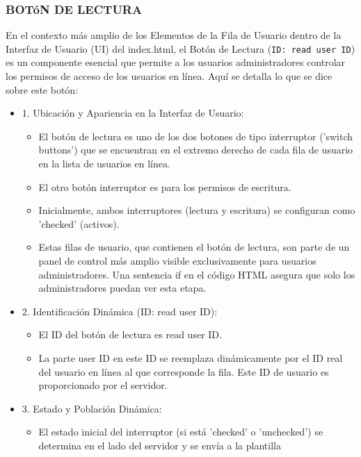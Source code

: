 \documentclass{report}
\begin{document}
\subsubsection{BOTóN DE LECTURA}
En el contexto más amplio de los Elementos de la Fila de Usuario dentro de la Interfaz de Usuario (UI) del index.html, el Botón de 
Lectura (\verb|ID: read user ID|) es un componente esencial que permite a los usuarios administradores controlar los permisos de acceso de 
los usuarios en línea.
Aquí se detalla lo que se dice sobre este botón:
\begin{itemize}
    \item 1. Ubicación y Apariencia en la Interfaz de Usuario:
        \begin{itemize}
            \item El botón de lectura es uno de los dos botones de tipo interruptor ('switch buttons') que se encuentran en el extremo 
            derecho de cada fila de usuario en la lista de usuarios en línea.
            \item El otro botón interruptor es para los permisos de escritura.
            \item Inicialmente, ambos interruptores (lectura y escritura) se configuran como 'checked' (activos).
            \item Estas filas de usuario, que contienen el botón de lectura, son parte de un panel de control más amplio visible exclusivamente 
            para usuarios administradores. Una sentencia if en el código HTML asegura que solo los administradores puedan ver esta etapa.        
        \end{itemize}
    \item 2. Identificación Dinámica (ID: read user ID):
        \begin{itemize}
            \item El ID del botón de lectura es read user ID.
            \item La parte user ID en este ID se reemplaza dinámicamente por el ID real del usuario en línea al que corresponde la fila. Este ID 
            de usuario es proporcionado por el servidor.        
        \end{itemize}
    \item 3. Estado y Población Dinámica:
        \begin{itemize}
            \item El estado inicial del interruptor (si está 'checked' o 'unchecked') se determina en el lado del servidor y se envía a la plantilla 

\end{itemize}
\end{itemize}
\end{document}
